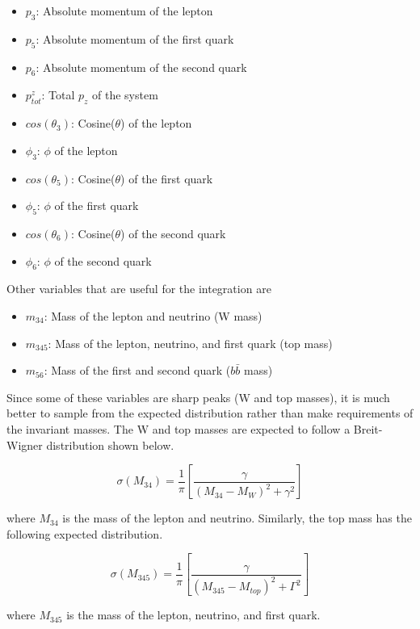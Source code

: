 \begin{itemize}
\item $p_{3}$: Absolute momentum of the lepton
\item $p_{5}$: Absolute momentum of the first quark
\item $p_{6}$: Absolute momentum of the second quark
\item $p_{tot}^{z}$: Total $p_{z}$ of the system
\item $cos(\theta_{3})$: Cosine($\theta$) of the lepton
\item $\phi_{3}$: $\phi$ of the lepton
\item $cos(\theta_{5})$: Cosine($\theta$) of the first quark
\item $\phi_{5}$: $\phi$ of the first quark
\item $cos(\theta_{6})$: Cosine($\theta$) of the second quark
\item $\phi_{6}$: $\phi$ of the second quark
\end{itemize}

Other variables that are useful for the integration are
\begin{itemize}
\item $m_{34}$: Mass of the lepton and neutrino (W mass)
\item $m_{345}$: Mass of the lepton, neutrino, and first quark (top mass)
\item $m_{56}$: Mass of the first and second quark ($b\bar{b}$ mass)
\end{itemize}

Since some of these variables are sharp peaks (W and top masses), it is much
better to sample from the expected distribution rather than make requirements of
the invariant masses. The W and top masses are expected to follow a Breit-Wigner
distribution shown below.

\begin{equation}
\sigma(M_{34}) = \frac{1}{\pi} \left[ \frac{\gamma}{(M_{34} - M_{W})^{2} +
\gamma^{2}} \right]
\end{equation}

where $M_{34}$ is the mass of the lepton and neutrino. Similarly, the top mass
has the following expected distribution.

\begin{equation}
\sigma(M_{345}) = \frac{1}{\pi} \left[ \frac{\gamma}{(M_{345} - M_{top})^{2} +
\Gamma^{2}} \right]
\end{equation}

where  $M_{345}$ is the mass of the lepton, neutrino, and first quark.

